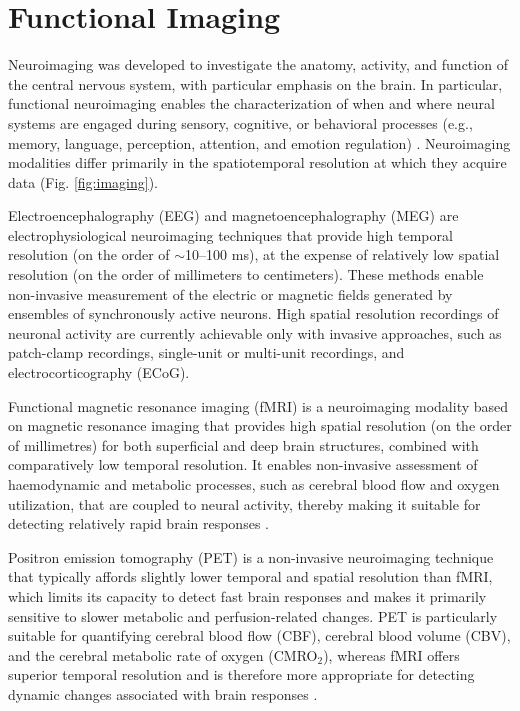 \section{Functional Imaging}
\label{sec:functionalimaging}

    
Neuroimaging was developed to investigate the anatomy, activity, and function of the central nervous system, with particular emphasis on the brain. In particular, functional neuroimaging enables the characterization of when and where neural systems are engaged during sensory, cognitive, or behavioral processes (e.g., memory, language, perception, attention, and emotion regulation) \citep{yenExploringFrontiersNeuroimaging2023}. Neuroimaging modalities differ primarily in the spatiotemporal resolution at which they acquire data (Fig. \ref{fig:imaging}).

Electroencephalography (EEG) and magnetoencephalography (MEG) are electrophysiological neuroimaging techniques that provide high temporal resolution (on the order of $\sim$10–100 ms), at the expense of relatively low spatial resolution (on the order of millimeters to centimeters). These methods enable non-invasive measurement of the electric or magnetic fields generated by ensembles of synchronously active neurons. High spatial resolution recordings of neuronal activity are currently achievable only with invasive approaches, such as patch-clamp recordings, single-unit or multi-unit recordings, and electrocorticography (ECoG).

Functional magnetic resonance imaging (fMRI) is a neuroimaging modality based on magnetic resonance imaging that provides high spatial resolution (on the order of millimetres) for both superficial and deep brain structures, combined with comparatively low temporal resolution. It enables non-invasive assessment of haemodynamic and metabolic processes, such as cerebral blood flow and oxygen utilization, that are coupled to neural activity, thereby making it suitable for detecting relatively rapid brain responses \citep{heegerSpikesBOLDWhat2000}.
%

Positron emission tomography (PET) is a non-invasive neuroimaging technique that typically affords slightly lower temporal and spatial resolution than fMRI, which limits its capacity to detect fast brain responses and makes it primarily sensitive to slower metabolic and perfusion-related changes. PET is particularly suitable for quantifying cerebral blood flow (CBF), cerebral blood volume (CBV), and the cerebral metabolic rate of oxygen (CMRO$_2$), whereas fMRI offers superior temporal resolution and is therefore more appropriate for detecting dynamic changes associated with brain responses \citep{frackowiakFunctionalNeuroanatomyHuman1994, foxMappingHumanVisual1986}. 

